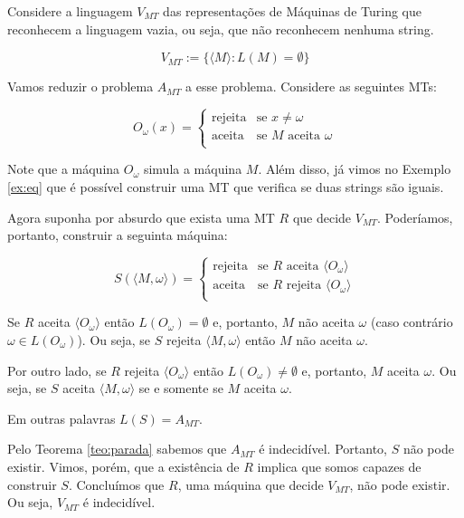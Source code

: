 \begin{example}
  \label{ex:vazio}
  Considere a linguagem $V_{MT}$ das representações de Máquinas de Turing que reconhecem a linguagem vazia, ou seja, que não reconhecem nenhuma string.

  \begin{displaymath}
    V_{MT} := \{\langle M \rangle : L(M) = \emptyset \} 
  \end{displaymath}

  Vamos reduzir o problema $A_{MT}$ a esse problema.
  Considere as seguintes MTs:

  \begin{displaymath}
    O_{\omega}(x) = \left\{\begin{array}{cl}
                 \textrm{rejeita} & \textrm{se $x \neq \omega$}\\
                 \textrm{aceita} & \textrm{se $M$ aceita $\omega$}\\ 
               \end{array}\right.
  \end{displaymath}

  Note que a máquina $O_\omega$ simula a máquina $M$.
  Além disso, já vimos no Exemplo \ref{ex:eq} que é possível construir uma MT que verifica se duas strings são iguais.

  Agora suponha por absurdo que exista uma MT $R$ que decide $V_{MT}$.
  Poderíamos, portanto, construir a seguinta máquina:

  \begin{displaymath}
    S(\langle M, \omega \rangle) = \left\{\begin{array}{cl}
                 \textrm{rejeita} & \textrm{se $R$ aceita $\langle O_\omega \rangle$}\\
                 \textrm{aceita} & \textrm{se $R$ rejeita $\langle O_\omega \rangle$}\\ 
               \end{array}\right.
  \end{displaymath}

  Se $R$ aceita $\langle O_\omega \rangle$ então $L(O_\omega) = \emptyset$ e, portanto, $M$ não aceita $\omega$ (caso contrário $\omega \in L(O_\omega)$).
  Ou seja, se $S$ rejeita $\langle M, \omega \rangle$ então $M$ não aceita $\omega$.

  Por outro lado, se $R$ rejeita $\langle O_\omega \rangle$ então $L(O_\omega) \neq \emptyset$ e, portanto, $M$ aceita $\omega$.
  Ou seja, se $S$ aceita $\langle M, \omega \rangle$ se e somente se $M$ aceita $\omega$.

  Em outras palavras $L(S) = A_{MT}$.

  Pelo Teorema \ref{teo:parada} sabemos que $A_{MT}$ é indecidível.
  Portanto, $S$ não pode existir.
  Vimos, porém, que a existência de $R$ implica que somos capazes de construir $S$.
  Concluímos que $R$, uma máquina que decide $V_{MT}$, não pode existir.
  Ou seja, $V_{MT}$ é indecidível.
\end{example}

